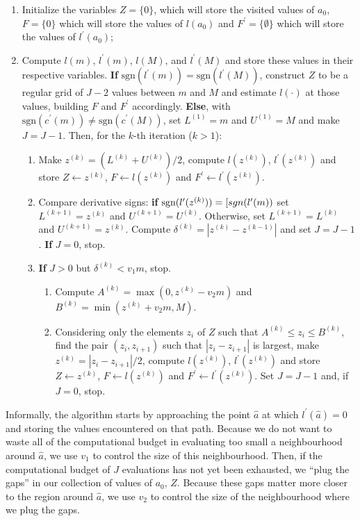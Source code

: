\documentclass[a4paper, notitlepage, 11pt]{article}
\begin{document}
\begin{enumerate}
 \item Initialize the variables $Z = \{ 0\}$, which will store the visited values of $a_0$,  $F = \{ 0\}$ which will store the values of $l(a_0)$ and $F^{\prime} = \{ \emptyset \}$ which will store the values of $l^{\prime}(a_0)$;
 \item Compute $l(m)$, $l^\prime(m)$, $l(M)$, and $l^\prime(M)$ and store these values in their respective variables.
\textbf{If} $\text{sgn}(l^\prime(m)) = \text{sgn}(l^\prime(M))$, construct $Z$ to be a regular grid of $J - 2$ values between $m$ and $M$ and estimate $l(\cdot)$ at those values, building $F$ and $F^{\prime}$ accordingly. 
\textbf{Else}, with $\text{sgn}(c^\prime(m)) \neq \text{sgn}(c^\prime(M))$, set $L^{(1)} = m$ and $U^{(1)} = M$ and  make $J = J - 1$.
Then, for the $k$-th iteration ($k > 1$):
 \begin{enumerate}
 \item Make $z^{(k)} = (L^{(k)} + U^{(k)})/2$, compute $l(z^{(k)})$, $l^{\prime}(z^{(k)})$ and store $Z \leftarrow z^{(k)}$, $F \leftarrow l(z^{(k)})$ and $F^{\prime} \leftarrow l^{\prime}(z^{(k)})$.
 \item Compare derivative signs: \textbf{if} $ \text{sgn}(l^\prime(z^{(k)})) = \text[{sgn}(l^\prime(m))$ set $L^{(k + 1)} = z^{(k)}$ and $U^{(k + 1)} = U^{(k)}$. 
 Otherwise, set $L^{(k + 1)} = L^{(k)}$ and $U^{(k + 1)} = z^{(k)}$. 
 Compute $\delta^{(k)} = |z^{(k)} - z^{(k-1)}|$ and set $J = J - 1$.
 \textbf{If} $J = 0$, stop.
 \item \textbf{If} $J > 0$ but $\delta^{(k)}  <  v_1 m $, stop.
 \begin{enumerate}
  \item Compute $A^{(k)} = \max(0, z^{(k)} - v_2m)$ and $ B^{(k)} = \min(z^{(k)} + v_2m, M)$.
  \item Considering only the elements $z_i$ of $Z$ such that $A^{(k)} \leq z_i \leq B^{(k)}$, find the pair $(z_i, z_{i + 1})$ such that $|z_{i} -z_{i + 1}|$ is largest, make $z^{(k)}  = |z_{i} -z_{i + 1}|/2$, compute $l(z^{(k)})$, $l^{\prime}(z^{(k)})$ and store $Z \leftarrow z^{(k)}$, $F \leftarrow l(z^{(k)})$ and $F^{\prime} \leftarrow l^{\prime}(z^{(k)})$.
  Set $J = J -1$ and, if $J = 0$, stop.
 \end{enumerate}
\end{enumerate}
\end{enumerate}
 
Informally, the algorithm starts by approaching the point $\hat{a}$ at which $l^\prime(\hat{a}) = 0$ and storing the values encountered on that path.
Because we do not want to waste all of the computational budget in evaluating too small a neighbourhood around $\hat{a}$, we use $v_1$ to control the size of this neighbourhood.
Then, if the computational budget of $J$ evaluations has not yet been exhausted, we ``plug the gaps'' in our collection of values of $a_0$, $Z$.
Because these gaps matter more closer to the region around $\hat{a}$, we use $v_2$ to control the size of the neighbourhood where we plug the gaps.
 
\end{document}
